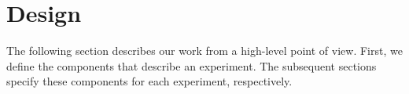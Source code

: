 \chapter{Design}
\label{ch:design}

The following section describes our work from a high-level point of view. First, we define the components that describe an experiment. The subsequent sections specify these components for each experiment, respectively.


